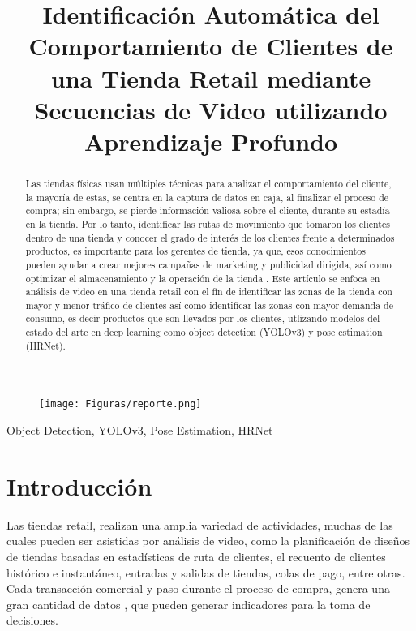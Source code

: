\documentclass[conference]{IEEEtran}
\author{\IEEEauthorblockN{Paul Percca, Ivan Sipiran} 
\IEEEauthorblockA{Pontificia Universidad Católica del Perú}
\IEEEauthorblockA{Lima, Perú}
\IEEEauthorblockA{cristian.percca@pucp.edu.pe, isipiran@pucp.edu.pe}
}
\title{Identificación Automática del Comportamiento de Clientes de una Tienda Retail mediante Secuencias de Video utilizando Aprendizaje Profundo}
\begin{document}
\begin{figure}[hbtp]
\centering
\texttt{[image: Figuras/reporte.png]}
\end{figure}

\maketitle

\begin{abstract}
Las tiendas físicas usan múltiples técnicas para analizar el comportamiento del cliente, la mayoría de estas, se centra en la captura de datos en caja, al finalizar el proceso de compra; sin embargo, se pierde información valiosa sobre el cliente, durante su estadía en la tienda. Por lo tanto, identificar las rutas de movimiento que tomaron los clientes dentro de una tienda y conocer el grado de interés de los clientes frente a determinados productos, es importante para los gerentes de tienda, ya que, esos conocimientos pueden ayudar a crear mejores campañas de marketing y publicidad dirigida, así como optimizar el almacenamiento y la operación de la tienda . Este artículo se enfoca en análisis de video en una tienda retail con el fin de identificar las zonas de la tienda con mayor y menor tráfico de clientes así como identificar las zonas con mayor demanda de consumo, es decir productos que son llevados por los clientes, utlizando modelos del estado del arte en deep learning como object detection (YOLOv3) y pose estimation (HRNet).

\end{abstract}

\begin{IEEEkeywords}
Object Detection, YOLOv3, Pose Estimation, HRNet
\end{IEEEkeywords}

\section{Introducción}
Las tiendas retail, realizan una amplia variedad de actividades, muchas de las cuales pueden ser asistidas por análisis de video, como la planificación de diseños de tiendas basadas en estadísticas de ruta de clientes, el recuento de clientes histórico e instantáneo, entradas y salidas de tiendas, colas de pago, entre otras. Cada transacción comercial y paso durante el proceso de compra, genera una gran cantidad de datos \cite{provost2013data}, que pueden generar indicadores para la toma de decisiones.
\end{document}
